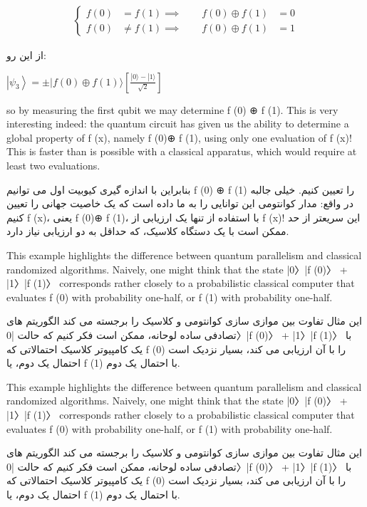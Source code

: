 \documentclass{book}
\begin{document}
$$
\begin{aligned}
	\left\{
	\begin{aligned}
		f(0) &= f(1) 
		\implies \qquad f(0) \oplus f(1) &= 0\\
		f(0) &\neq f(1) 
		\implies \qquad f(0) \oplus f(1) &= 1
	\end{aligned}
	\right.
\end{aligned}$$

از این رو:

\begin{center}
	$\left|\psi_3\right\rangle= \pm|f(0) \oplus f(1)\rangle\left[\frac{|0\rangle-|1\rangle}{\sqrt{2}}\right]$
\end{center}



so by measuring the first qubit we may determine f (0) ⊕ f (1). This is very interesting
indeed: the quantum circuit has given us the ability to determine a global property of
f (x), namely f (0)⊕ f (1), using only one evaluation of f (x)! This is faster than is possible
with a classical apparatus, which would require at least two evaluations.

بنابراین با اندازه گیری کیوبیت اول می توانیم f (0) ⊕ f (1) را تعیین کنیم. خیلی جالبه
در واقع: مدار کوانتومی این توانایی را به ما داده است که یک خاصیت جهانی را تعیین کنیم
f (x)، یعنی f (0)⊕ f (1)، با استفاده از تنها یک ارزیابی از f (x)! این سریعتر از حد ممکن است
با یک دستگاه کلاسیک، که حداقل به دو ارزیابی نیاز دارد.

This example highlights the difference between quantum parallelism and classical
randomized algorithms. Naively, one might think that the state |0〉|f (0)〉 + |1〉|f (1)〉
corresponds rather closely to a probabilistic classical computer that evaluates f (0) with
probability one-half, or f (1) with probability one-half.

این مثال تفاوت بین موازی سازی کوانتومی و کلاسیک را برجسته می کند
الگوریتم های تصادفی ساده لوحانه، ممکن است فکر کنیم که حالت |0〉|f (0)〉 + |1〉|f (1)〉
با یک کامپیوتر کلاسیک احتمالاتی که f (0) را با آن ارزیابی می کند، بسیار نزدیک است
احتمال یک دوم، یا f (1) با احتمال یک دوم.

This example highlights the difference between quantum parallelism and classical
randomized algorithms. Naively, one might think that the state |0〉|f (0)〉 + |1〉|f (1)〉
corresponds rather closely to a probabilistic classical computer that evaluates f (0) with
probability one-half, or f (1) with probability one-half.


این مثال تفاوت بین موازی سازی کوانتومی و کلاسیک را برجسته می کند
الگوریتم های تصادفی ساده لوحانه، ممکن است فکر کنیم که حالت |0〉|f (0)〉 + |1〉|f (1)〉
با یک کامپیوتر کلاسیک احتمالاتی که f (0) را با آن ارزیابی می کند، بسیار نزدیک است
احتمال یک دوم، یا f (1) با احتمال یک دوم.
\end{document}
